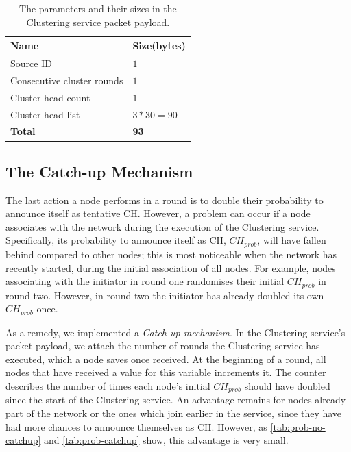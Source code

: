 \begin{table}[bt]
\centering
\caption{The parameters and their sizes in the Clustering service packet payload.}
\label{table:cluster-service-packet}
\begin{tabular}{|l|l|}
\hline
\textbf{Name}               & \textbf{Size(bytes)} \\ \hline
Source ID                   & $1$                    \\
Consecutive cluster rounds  & $1$                    \\
Cluster head count          & $1$                    \\
Cluster head list           & $3*30=90$              \\ \hline
\textbf{Total}              & \textbf{93}          \\ \hline
\end{tabular}
\end{table}

\subsection{The Catch-up Mechanism}
\label{subsec:catch-up-mechanism}
The last action a node performs in a round is to double their probability to announce itself as tentative CH. However, a problem can occur if a node associates with the network during the execution of the Clustering service. Specifically, its probability to announce itself as CH, $CH_{prob}$, will have fallen behind compared to other nodes; this is most noticeable when the network has recently started, during the initial association of all nodes. For example, nodes associating with the initiator in round one randomises their initial $CH_{prob}$ in round two. However, in round two the initiator has already doubled its own $CH_{prob}$ once.

As a remedy, we implemented a \textit{Catch-up mechanism}. In the Clustering service's packet payload, we attach the number of rounds the Clustering service has executed, which a node saves once received. At the beginning of a round, all nodes that have received a value for this variable increments it. The counter describes the number of times each node's initial $CH_{prob}$ should have doubled since the start of the Clustering service. An advantage remains for nodes already part of the network or the ones which join earlier in the service, since they have had more chances to announce themselves as CH. However, as \cref{tab:prob-no-catchup} and \cref{tab:prob-catchup} show, this advantage is very small.

